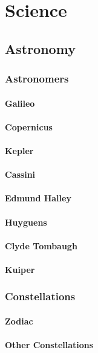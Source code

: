 \chapter{Science}
	\section{Astronomy}
		\subsection{Astronomers}
			\subsubsection{Galileo}
			\subsubsection{Copernicus}
			\subsubsection{Kepler}
			\subsubsection{Cassini}
			\subsubsection{Edmund Halley}
			\subsubsection{Huyguens}
			\subsubsection{Clyde Tombaugh}
			\subsubsection{Kuiper}
			
		\subsection{Constellations}
			\subsubsection{Zodiac}
			\subsubsection{Other Constellations}
		
